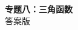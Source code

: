 \documentclass[zihao=-4]{exam-zh}
\begin{document}
\begin{center}
  {\bfseries 专题八：三角函数}\\[4pt]
  { 答案版}
\end{center}

\end{document}
